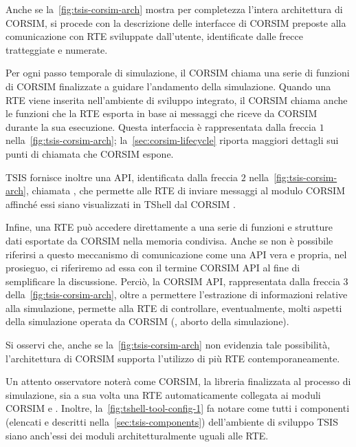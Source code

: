 Anche se la~\vref{fig:tsis-corsim-arch} mostra per completezza l'intera architettura di \acs{CORSIM}, si procede con la descrizione delle interfacce di \acs{CORSIM} preposte alla comunicazione con \acs{RTE} sviluppate dall'utente, identificate dalle frecce tratteggiate e numerate.

Per ogni passo temporale di simulazione, il \acs{CORSIM}  chiama una serie di funzioni di \acs{CORSIM} finalizzate a guidare l'andamento della simulazione. Quando una \acs{RTE} viene inserita nell'ambiente di sviluppo integrato, il \acs{CORSIM}  chiama anche le funzioni che la \acs{RTE} esporta in base ai messaggi che riceve da \acs{CORSIM} durante la sua esecuzione. Questa interfaccia è rappresentata dalla freccia $1$ nella~\vref{fig:tsis-corsim-arch}; la~\vref{sec:corsim-lifecycle} riporta maggiori dettagli sui punti di chiamata che \acs{CORSIM} espone.

\acs{TSIS} fornisce inoltre una \acs{API}, identificata dalla freccia $2$ nella~\vref{fig:tsis-corsim-arch}, chiamata , che permette alle \acs{RTE} di inviare messaggi al modulo \acs{CORSIM}  affinché essi siano visualizzati in \acs{TShell} dal \acs{CORSIM} .

Infine, una \acs{RTE} può accedere direttamente a una serie di funzioni e strutture dati esportate da \acs{CORSIM} nella memoria condivisa. Anche se non è possibile riferirsi a questo meccanismo di comunicazione come una \acs{API} vera e propria, nel prosieguo, ci riferiremo ad essa con il termine \acs{CORSIM} \acs{API} al fine di semplificare la discussione. Perciò, la \acs{CORSIM} \acs{API}, rappresentata dalla freccia $3$ della~\vref{fig:tsis-corsim-arch}, oltre a permettere l'estrazione di informazioni relative alla simulazione, permette alla \acs{RTE} di controllare, eventualmente, molti aspetti della simulazione operata da \acs{CORSIM} (\eg{}, aborto della simulazione). 

Si osservi che, anche se la~\vref{fig:tsis-corsim-arch} non evidenzia tale possibilità, l'architettura di \acs{CORSIM} supporta l'utilizzo di più \acs{RTE} contemporaneamente.

\begin{nota}
Un attento osservatore noterà come \acs{CORSIM}, la libreria finalizzata al processo di simulazione, sia a sua volta una \acs{RTE} automaticamente collegata ai moduli \acs{CORSIM}  e . Inoltre, la~\vref{fig:tshell-tool-config-1} fa notare come tutti i componenti (elencati e descritti nella~\vref{sec:tsis-components}) dell'ambiente di sviluppo \acs{TSIS} siano anch'essi dei moduli architetturalmente uguali alle \acs{RTE}.
\end{nota}

